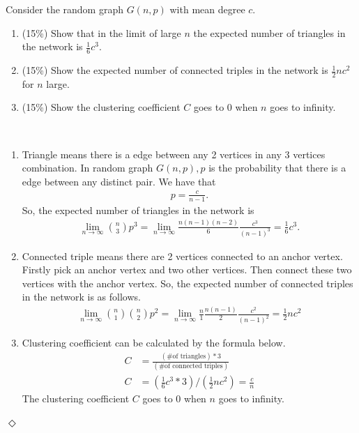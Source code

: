 \documentclass[12pt]{article}
\newcommand {\bsolution}{\noindent {\em Solution:} \ }
\newcommand{\esolution}{\hfill $\Diamond$ \\ \vspace{.3cm}}
\begin{document}
 Consider the random graph $G(n,p)$ with mean degree $c$.\\
\begin{enumerate}[label=(\alph*)]
	\item (15\%) Show that in the limit of large $n$ the expected number of triangles in the network is $\frac{1}{6}c^3$.
	\item (15\%) Show the expected number of connected triples in the network is $\frac{1}{2}nc^2$ for $n$ large.
	\item (15\%) Show the clustering coefficient $C$ goes to $0$ when $n$ goes to infinity.
	
\end{enumerate}

\bsolution
\begin{enumerate}[label=(\alph*)]
	\item Triangle means there is a edge between any 2 vertices in any 3 vertices combination. In random graph $G(n, p), p$ is the probability that there is a edge between any distinct pair. We have that
		\begin{align*}
			p = \frac{c}{n-1}\text{.}
		\end{align*}
	So, the expected number of triangles in the network is
		\begin{align*}
			\lim_{n \to \infty}{n \choose 3}p^3 = \lim_{n \to \infty}\frac{n(n-1)(n-2)}{6}\frac{c^3}{(n-1)^3}=\frac{1}{6}c^3\text{.}
		\end{align*}
	\item Connected triple means there are 2 vertices connected to an anchor vertex. Firstly pick an anchor vertex and two other vertices. Then connect these two vertices with the anchor vertex. So, the expected number of connected triples in the network is as follows.
		\begin{align*}
			\lim_{n \to \infty}{n \choose 1}{n \choose 2}p^2=\lim_{n \to \infty}\frac{n}{1}\frac{n(n-1)}{2}\frac{c^2}{(n-1)^2}=\frac{1}{2}nc^2
		\end{align*} 
	\item Clustering coefficient can be calculated by the formula below.
		\begin{align*}
			C &= \frac{(\text{\# of triangles})*3}{(\text{\# of connected triples})} \\
			C &= (\frac{1}{6}c^3*3) / (\frac{1}{2}nc^2)=\frac{c}{n}
		\end{align*}
		The clustering coefficient $C$ goes to 0 when $n$ goes to infinity.
\end{enumerate}
\esolution
\end{document}
